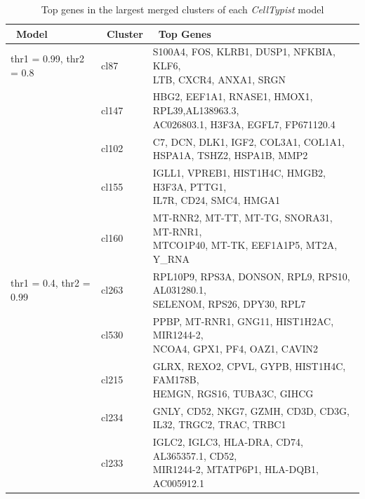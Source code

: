 \begin{table}[ht!] %
\footnotesize
\caption[Top genes in the largest merged clusters of each \textit{CellTypist} model]{Top genes in the largest merged clusters of each \textit{CellTypist} model}
\centering
\label{table:tab_appB_clgenes}

\begin{tabular}{l|l|l}
\toprule
~\textbf{Model} & ~\textbf{Cluster} & ~\textbf{Top Genes} \\
\midrule
thr1 = 0.99, thr2 = 0.8 & cl87 & \specialcell[t]{S100A4, FOS, KLRB1, DUSP1, NFKBIA, KLF6,\\LTB, CXCR4, ANXA1, SRGN} \\
 & cl147 & \specialcell[t]{HBG2, EEF1A1, RNASE1, HMOX1, RPL39,AL138963.3,\\AC026803.1, H3F3A, EGFL7, FP671120.4}  \\
 & cl102 & \specialcell[t]{C7, DCN, DLK1, IGF2, COL3A1, COL1A1,\\HSPA1A, TSHZ2, HSPA1B, MMP2} \\
 & cl155 & \specialcell[t]{IGLL1, VPREB1, HIST1H4C, HMGB2, H3F3A, PTTG1,\\IL7R, CD24, SMC4, HMGA1} \\
 & cl160 & \specialcell[t]{MT-RNR2, MT-TT, MT-TG, SNORA31, MT-RNR1,\\MTCO1P40, MT-TK, EEF1A1P5, MT2A, Y\_RNA} \\
 
\midrule
thr1 = 0.4, thr2 = 0.99 & cl263 & \specialcell[t]{RPL10P9, RPS3A, DONSON, RPL9, RPS10, AL031280.1,\\SELENOM, RPS26, DPY30, RPL7}  \\
 & cl530 & \specialcell[t]{PPBP, MT-RNR1, GNG11, HIST1H2AC, MIR1244-2,\\NCOA4, GPX1, PF4, OAZ1, CAVIN2}  \\
 & cl215 & \specialcell[t]{GLRX, REXO2, CPVL, GYPB, HIST1H4C, FAM178B,\\HEMGN, RGS16, TUBA3C, GIHCG}  \\
 & cl234 & \specialcell[t]{GNLY, CD52, NKG7, GZMH, CD3D, CD3G,\\IL32, TRGC2, TRAC, TRBC1}  \\
 & cl233 & \specialcell[t]{IGLC2, IGLC3, HLA-DRA, CD74, AL365357.1, CD52,\\ MIR1244-2, MTATP6P1, HLA-DQB1, AC005912.1}  \\
 

\end{tabular}
\end{table}

